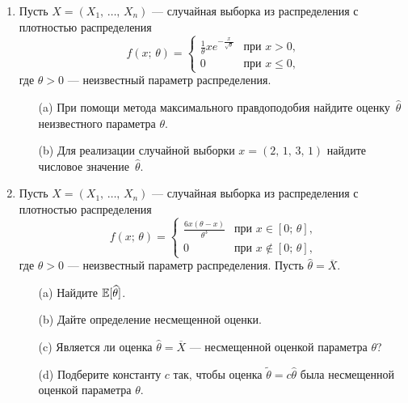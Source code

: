 \documentclass[12pt, a4paper]{article}\usepackage[]{graphicx}\usepackage[]{color}
\begin{document}
\begin{enumerate}
							\item
							Пусть $X = (X_1, \, \ldots, \, X_n)$ — случайная выборка из распределения с плотностью распределения
							\[
							f(x; \, \theta) = \left\{
							\begin{array}{ll}
							\tfrac{1}{\theta}xe^{-\tfrac{x}{\sqrt{\theta}}} & \text{при $x > 0$,} \\
							0 & \text{при $x \leq 0$,}
							\end{array}
							\right.
							\]
							где $\theta > 0$ — неизвестный параметр распределения.
							\begin{itemize}
								\item[(a)] При помощи метода максимального правдоподобия найдите оценку~$\widehat{\theta}$ неизвестного параметра $\theta$.
								\item[(b)] Для реализации случайной выборки $x = (2, \, 1, \, 3, \, 1)$ найдите числовое значение~$\widehat{\theta}$.
							\end{itemize}

							\item
							Пусть $X = (X_1, \, \ldots, \, X_n)$ — случайная выборка из распределения с плотностью распределения
							\[
							f(x; \, \theta) = \left\{
							\begin{array}{ll}
							\frac{6x(\theta - x)}{\theta^3} & \text{при $x \in [0; \, \theta]$,} \\
							0 & \text{при $x \not\in [0; \, \theta]$,}
							\end{array}
							\right.
							\]
							где $\theta > 0$ — неизвестный параметр распределения. Пусть $\widehat{\theta} = \overline{X}$.
							\begin{itemize}
								\item[(a)] Найдите $\mathbb{E}[\widehat{\theta}]$.
								\item[(b)] Дайте определение несмещенной оценки.
								\item[(c)] Является ли оценка $\widehat{\theta} = \overline{X}$ — несмещенной оценкой параметра $\theta$?
								\item[(d)] Подберите константу $c$ так, чтобы оценка $\widetilde{\theta} = c \widehat{\theta}$ была несмещенной оценкой параметра $\theta$.
							\end{itemize}


\end{enumerate}
\end{document}
